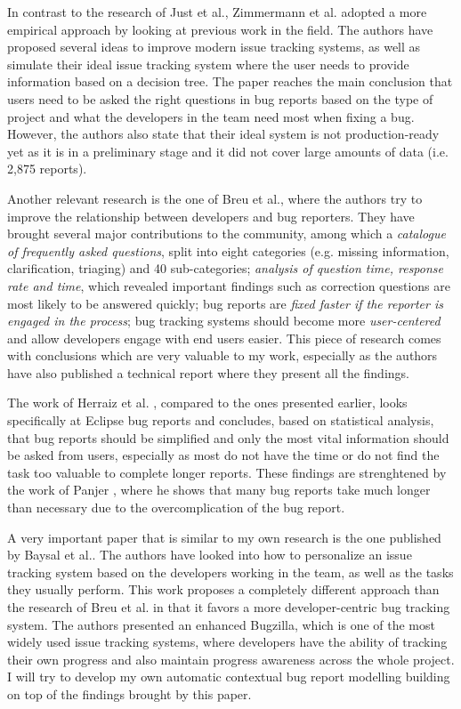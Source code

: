 \documentclass[11pt,english,twocolumn]{article}
\begin{document}
In contrast to the research of Just et al.\cite{just2008towards}, 
Zimmermann et al.\cite{zimmermann2009improving} adopted a more empirical
approach by looking at previous work in the field. The authors have
proposed several ideas to improve modern issue tracking systems, as well
as simulate their ideal issue tracking system where the user needs to
provide information based on a decision tree. The paper reaches the
main conclusion that users need to be asked the right questions in
bug reports based on the type of project and what the developers in the
team need most when fixing a bug. However, the authors also state that
their ideal system is not production-ready yet as it is in a preliminary
stage and it did not cover large amounts of data (i.e. 2,875 reports).

Another relevant research is the one of Breu et al.\cite{breu2010information},
where the authors try to improve the relationship between developers and
bug reporters. They have brought several major contributions to the community,
among which a \emph{catalogue of frequently asked questions}, split into
eight categories (e.g. missing information, clarification, triaging) and 
40 sub-categories; \emph{analysis of question time, response rate and time},
which revealed important findings such as correction questions are most 
likely to be answered quickly; bug reports are \emph{fixed faster if the
reporter is engaged in the process}; bug tracking systems should become
more \emph{user-centered} and allow developers engage with end users 
easier. This piece of research comes with conclusions which are very 
valuable to my work, especially as the authors have also published a 
technical report \cite{breu2009appendix} where they present all the findings.

The work of Herraiz et al. \cite{herraiz2008towards}, compared to the ones
presented earlier, looks specifically at Eclipse bug reports and concludes,
based on statistical analysis, that bug reports should be simplified and 
only the most vital information should be asked from users, especially as
most do not have the time or do not find the task too valuable to complete
longer reports. These findings are strenghtened by the work of 
Panjer \cite{panjer2007predicting}, where he shows that many bug reports
take much longer than necessary due to the overcomplication of the bug 
report.

A very important paper that is similar to my own research is the one 
published by Baysal et al.\cite{baysal2013situational}. The authors
have looked into how to personalize an issue tracking system based on the
developers working in the team, as well as the tasks they usually perform.
This work proposes a completely different approach than the research of
Breu et al.\cite{breu2010information} in that it favors a more 
developer-centric bug tracking system. The authors presented an enhanced
Bugzilla, which is one of the most widely used issue tracking systems, where
developers have the ability of tracking their own progress and also maintain
progress awareness across the whole project. I will try to develop my
own automatic contextual bug report modelling building on top of the findings
brought by this paper.
\end{document}
